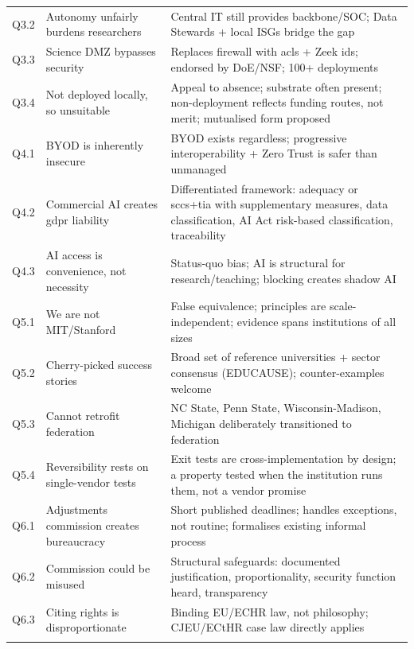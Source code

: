 \begin{longtable}{>{\raggedright}p{1cm} >{\raggedright}p{5.5cm} >{\raggedright\arraybackslash}p{7.5cm}}
\addlinespace
Q3.2 & Autonomy unfairly burdens researchers & Central IT still provides backbone/SOC; Data Stewards + local ISGs bridge the gap \\
\addlinespace
Q3.3 & Science DMZ bypasses security & Replaces firewall with \gls{acl}s + Zeek \gls{ids}; endorsed by DoE/NSF; 100+ deployments \\
\addlinespace
Q3.4 & Not deployed locally, so unsuitable & Appeal to absence; substrate often present; non-deployment reflects funding routes, not merit; mutualised form proposed \\
\addlinespace
Q4.1 & BYOD is inherently insecure & BYOD exists regardless; progressive interoperability + Zero Trust is safer than unmanaged \\
\addlinespace
Q4.2 & Commercial AI creates \gls{gdpr} liability & Differentiated framework: adequacy or \gls{scc}s+\gls{tia} with supplementary measures, data classification, AI Act risk-based classification, traceability \\
\addlinespace
Q4.3 & AI access is convenience, not necessity & Status-quo bias; AI is structural for research/teaching; blocking creates shadow AI \\
\addlinespace
Q5.1 & We are not MIT/Stanford & False equivalence; principles are scale-independent; evidence spans institutions of all sizes \\
\addlinespace
Q5.2 & Cherry-picked success stories & Broad set of reference universities + sector consensus (EDUCAUSE); counter-examples welcome \\
\addlinespace
Q5.3 & Cannot retrofit federation & NC State, Penn State, Wisconsin-Madison, Michigan deliberately transitioned to federation \\
\addlinespace
Q5.4 & Reversibility rests on single-vendor tests & Exit tests are cross-implementation by design; a property tested when the institution runs them, not a vendor promise \\
\addlinespace
Q6.1 & Adjustments commission creates bureaucracy & Short published deadlines; handles exceptions, not routine; formalises existing informal process \\
\addlinespace
Q6.2 & Commission could be misused & Structural safeguards: documented justification, proportionality, security function heard, transparency \\
\addlinespace
Q6.3 & Citing rights is disproportionate & Binding EU/ECHR law, not philosophy; CJEU/ECtHR case law directly applies \\
\addlinespace

\end{longtable}

